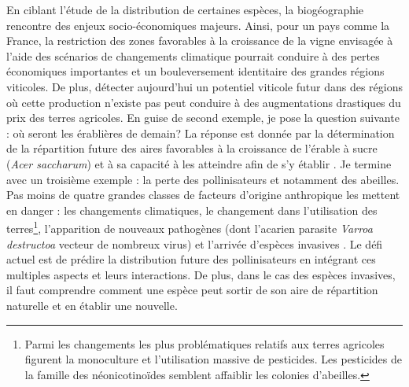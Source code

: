 En ciblant l'étude de la distribution de certaines espèces, la
biogéographie rencontre des enjeux socio-économiques majeurs. Ainsi,
pour un pays comme la France, la restriction des zones favorables à la
croissance de la vigne envisagée à l'aide des scénarios de changements
climatique \citep{Hannah2013} pourrait conduire à des pertes économiques
importantes et un bouleversement identitaire des grandes régions
viticoles. De plus, détecter aujourd'hui un potentiel viticole futur
dans des régions où cette production n'existe pas peut conduire à des
augmentations drastiques du prix des terres agricoles. En guise de
second exemple, je pose la question suivante : où seront les érablières
de demain? La réponse est donnée par la détermination de la répartition
future des aires favorables à la croissance de l'érable à sucre
(\emph{Acer saccharum}) et à sa capacité à les atteindre afin de s'y
établir \citep{Solarik2016}. Je termine avec un troisième exemple : la
perte des pollinisateurs et notamment des abeilles. Pas moins de quatre
grandes classes de facteurs d'origine anthropique les mettent en danger
: les changements climatiques, le changement dans l'utilisation des
terres\footnote{Parmi les changements les plus problématiques relatifs
  aux terres agricoles figurent la monoculture et l'utilisation massive
  de pesticides. Les pesticides de la famille des néonicotinoïdes
  semblent affaiblir les colonies d'abeilles.}, l'apparition de nouveaux
pathogènes (dont l'acarien parasite \emph{Varroa destructoa} vecteur de
nombreux virus) et l'arrivée d'espèces invasives \citep[comme le frelon
asiatique][]{Vanbergen2013}. Le défi actuel est de prédire la
distribution future des pollinisateurs en intégrant ces multiples
aspects et leurs interactions. De plus, dans le cas des espèces
invasives, il faut comprendre comment une espèce peut sortir de son aire
de répartition naturelle et en établir une nouvelle.

